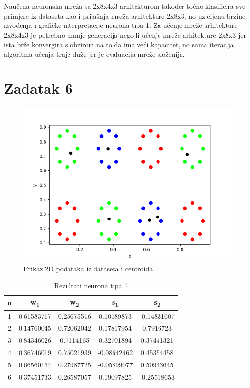 \documentclass[times, utf8, seminar]{fer}
\begin{document}
Naučena neuronska mreža sa 2x8x4x3 arhitekturom također točno klasificira sve primjere iz dataseta kao i prijašnja mreža arhitekture 2x8x3, no uz cijenu brzine izvođenja i grafičke interpretacije neurona tipa 1. Za učenje mreže arhitekture 2x8x4x3 je potrebno manje generacija nego li učenje mreže arhitekture 2x8x3 jer ista brže konvergira s obzirom na to da ima veći kapacitet, no sama iteracija algoritma učenja traje duže jer je evaluacija mreže složenija.  

\chapter{Zadatak 6}
\begin{figure}[H]
    \centering
    \includegraphics[scale=0.7]{img/zad_6.png}
    \caption[Caption for LOF]{Prikaz 2D podataka iz dataseta i centroida\footnotemark}
    \label{zad6:img}
\end{figure}

\begin{table}[H]
    \centering
    \begin{tabular}{|c c c c c|} 
        \hline
        n & w\textsubscript{1} & w\textsubscript{2} & s\textsubscript{1} & s\textsubscript{2} \\ [0.5ex] 
        \hline\hline
        \rowcolor{Blue}
        1 & 0.61583717 & 0.25675516 & 0.10189873 & -0.14831607 \\
        \rowcolor{Green}
        2 & 0.14760045 & 0.72062042 & 0.17817954 & 0.7916723 \\
        \rowcolor{Green}
        3 & 0.84346026 & 0.7114165 & 0.32701894 & 0.37441321 \\
        \rowcolor{Blue}
        4 & 0.36746019 & 0.75021939 & -0.08642462 & 0.45354458 \\
        \rowcolor{Blue}
        5 & 0.66560164 & 0.27987725 & -0.05899077 & 0.50943645 \\
        \rowcolor{Green}
        6 & 0.37451733 & 0.26587057 & 0.19097825 & -0.25518653 \\ [1ex]
        \hline
    \end{tabular}
    \caption{Rezultati neurona tipa 1}
    \label{zad6:table}
\end{table}



\nocite{*}
\end{document}
